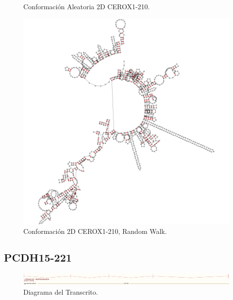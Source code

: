 \documentclass[a4paper,11pt,titlepage]{article}
\theoremstyle{definition}
\begin{document}
\begin{figure}[H]
\begin{minipage}[c]{0.31\textwidth}
        \caption{Conformación Aleatoria 2D CEROX1-210.}
        \label{fig:CEROX1-210-rndc}
    \end{minipage}
    \hfill
    \begin{minipage}[c]{0.31\textwidth}
        \centering
        \includegraphics[width=\textwidth]{images/CEROX1-210-db_one_conf.png}
        \caption{Conformación 2D CEROX1-210, Random Walk.}
        \label{fig:CEROX1-210-rndw}
    \end{minipage}
\end{figure}



\newpage
\subsection*{PCDH15-221}\label{subsec:gene2}

\begin{figure}[H]
    \centering
    \includegraphics[width=\textwidth]{images/PCDH15-221.png}
    \caption{Diagrama del Transcrito.}
    \label{fig:PCDH15-221-diag}
\end{figure}
\end{document}
